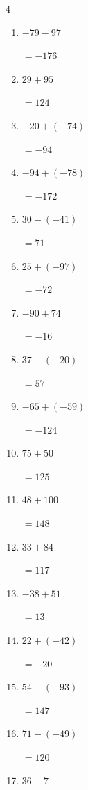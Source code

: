 \begin{multicols}{4}
\begin{enumerate}
        $=23$

  \item $-79-97$

        $=-176$

  \item $29+95$

        $=124$

  \item $-20+(-74)$

        $=-94$

  \item $-94+(-78)$

        $=-172$

  \item $30-(-41)$

        $=71$

  \item $25+(-97)$

        $=-72$

  \item $-90+74$

        $=-16$

  \item $37-(-20)$

        $=57$

  \item $-65+(-59)$

        $=-124$

  \item $75+50$

        $=125$

  \item $48+100$

        $=148$

  \item $33+84$

        $=117$

\columnbreak %

  \item $-38+51$

        $=13$

  \item $22+(-42)$

        $=-20$

  \item $54-(-93)$

        $=147$

  \item $71-(-49)$

        $=120$

  \item $36-7$


\end{enumerate}
\end{multicols}
